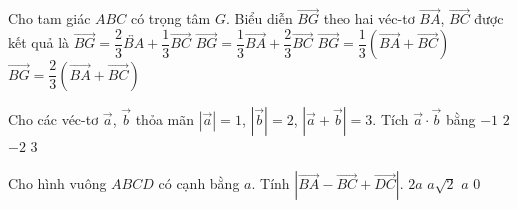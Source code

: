 \begin{ex}%
	Cho tam giác $ABC$ có trọng tâm $G$. Biểu diễn $\overrightarrow{BG}$ theo hai véc-tơ $\overrightarrow{BA}$, $\overrightarrow{BC}$ được kết quả là
	\choice
	{$\overrightarrow{BG}=\dfrac{2}{3}\overleftrightarrow{BA}+\dfrac{1}{3}\overrightarrow{BC}$}
	{$\overrightarrow{BG}=\dfrac{1}{3}\overrightarrow{BA}+\dfrac{2}{3}\overrightarrow{BC}$}
	{\True $\overrightarrow{BG}=\dfrac{1}{3}\left(\overrightarrow{BA}+\overrightarrow{BC}\right)$}
	{$\overrightarrow{BG}=\dfrac{2}{3}\left(\overrightarrow{BA}+\overrightarrow{BC}\right)$}
\end{ex}

\begin{ex}%
	Cho các véc-tơ $\vec{a}$, $\vec{b}$ thỏa mãn $\left|\vec{a}\right|=1$, $\left|\vec{b}\right|=2$, $\left|\vec{a}+\vec{b}\right|=3$. Tích $\vec{a} \cdot \vec{b}$ bằng
	\choice
	{$-1$}
	{\True $2$}
	{$-2$}
	{$3$}
\end{ex}

\begin{ex}%
	Cho hình vuông $ABCD$ có cạnh bằng $a$. Tính $\left|\overrightarrow{BA}-\overrightarrow{BC}+\overrightarrow{DC}\right|$.
	\choice
	{$2a$}
	{$a\sqrt{2}$}
	{\True $a$}
	{$0$}
\end{ex}

